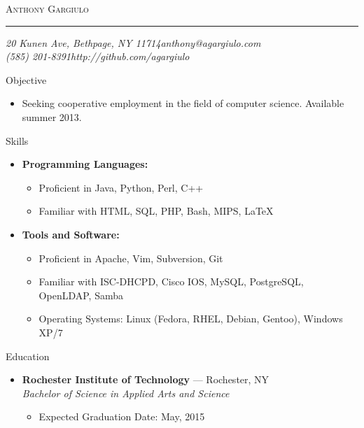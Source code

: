 \documentclass[10pt,oneside]{article}
\makeatletter
\newcommand{\name}{Anthony Gargiulo}
\newcommand{\addr}{20 Kunen Ave, Bethpage, NY 11714}
\newcommand{\phone}{(585) 201-8391}
\newcommand{\email}{anthony@agargiulo.com}
\newcommand{\github}{http://github.com/agargiulo}
\newcommand{\bigname}[1]{
	\begin{center}\fontfamily{ppl}\selectfont\Huge\scshape#1\end{center}
}
\newenvironment{ressection}[1]{
	\vspace{3pt}
	{\fontfamily{ppl}\selectfont\Large#1}
	\begin{itemize}
	\vspace{2pt}
}{
	\end{itemize}
}
\newcommand{\resitem}[1]{
	\vspace{-2pt}
	\item \begin{flushleft} #1 \end{flushleft}
}
\newcommand{\ressubitem}[1]{
	\vspace{-1pt}
	\item \begin{flushleft} #1 \end{flushleft}
}
\newcommand{\resbigitem}[3]{
	\vspace{-3pt}
	\item
	\textbf{#1} --- #2 \\
	\textit{#3}
}
\newenvironment{ressubsec}[3]{
	\resbigitem{#1}{#2}{#3}
	\vspace{-1pt}
	\begin{itemize}
}{
	\end{itemize}
}
\newenvironment{reslist}[1]{
	\resitem{\textbf{#1}}
	\vspace{-3pt}
	\begin{itemize}
}{
	\end{itemize}
}
\makeatother
\begin{document}
 \selectfont

\bigname{\name}

\vspace{-4pt} \rule{\textwidth}{1pt}

\vspace{-1pt} {\normalsize\itshape \addr \hfill \email \\ \phone \hfill \github}

\vspace{15 pt}



\begin{ressection}{Objective}

	\ressubitem{Seeking cooperative employment in the field of computer science. Available summer 2013.}

\end{ressection}
\begin{ressection}{Skills}


	\begin{reslist}{Programming Languages:}
		\ressubitem{Proficient in Java, Python, Perl, C++}
		\ressubitem{Familiar with HTML, SQL, PHP, Bash, MIPS, \LaTeX}
	\end{reslist}

	\begin{reslist}{Tools and Software:}
		\ressubitem{Proficient in Apache, Vim, Subversion, Git}
		\ressubitem{Familiar with ISC-DHCPD, Cisco IOS, MySQL, PostgreSQL, OpenLDAP, Samba}
		\ressubitem{Operating Systems: Linux (Fedora, RHEL, Debian, Gentoo), Windows XP/7}
	\end{reslist}

\end{ressection}

\begin{ressection}{Education}

	\begin{ressubsec}{Rochester Institute of Technology}{Rochester, NY}{Bachelor of Science in Applied Arts and Science}
		\ressubitem{Expected Graduation Date: May, 2015}
	\end{ressubsec}

\end{ressection}
\end{document}
